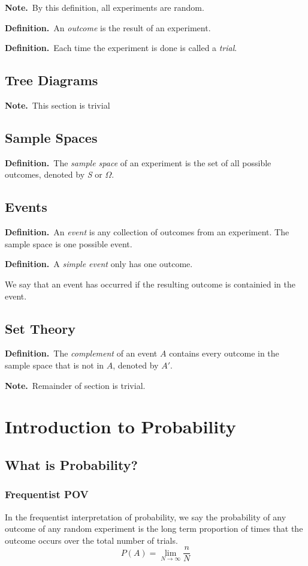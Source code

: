 \documentclass{report}
\newcommand{\dfn}[1]{\textbf{Definition.}\ #1 }
\newcommand{\nt}[1]{\textbf{Note.}\ #1 }
\begin{document}
            \nt{By this definition, all experiments are random.}

            \dfn{An \emph{outcome} is the result of an experiment.}

            \dfn{Each time the experiment is done is called a \emph{trial}.}
        \subsection{Tree Diagrams}  %
            \nt{This section is trivial}
        \subsection{Sample Spaces}  %
            \dfn{The \emph{sample space} of an experiment is the set of all possible outcomes, denoted by \emph{S} or $\Omega$.}
        \subsection{Events}  %
            \dfn{An \emph{event} is any collection of outcomes from an experiment. The sample space is one possible event.}

            \dfn{A \emph{simple event} only has one outcome.}

            We say that an event has occurred if the resulting outcome is containied in the event.
        \subsection{Set Theory}  %
            \dfn{The \emph{complement} of an event $A$ contains every outcome in the sample space that is not in $A$, denoted by $A'$.}
            
            \nt{Remainder of section is trivial.}

    \section{Introduction to Probability}  %
        \subsection{What is Probability?}  %
            \subsubsection{Frequentist POV}  %
                In the frequentist interpretation of probability, we say the probability of any outcome of any random experiment is the long term proportion of times that the outcome occurs over the total number of trials.
                \begin{equation}P(A)=\lim_{N\to\infty}\frac{n}{N}\end{equation}
\end{document}
